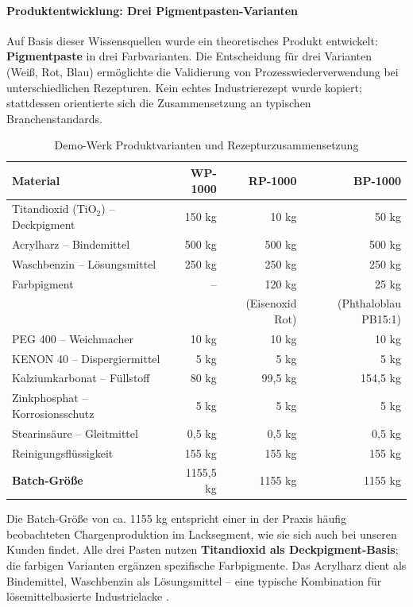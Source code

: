 \paragraph{Produktentwicklung: Drei Pigmentpasten-Varianten}

Auf Basis dieser Wissensquellen wurde ein theoretisches Produkt entwickelt: \textbf{Pigmentpaste} in drei Farbvarianten. Die Entscheidung für drei Varianten (Weiß, Rot, Blau) ermöglichte die Validierung von Prozesswiederverwendung bei unterschiedlichen Rezepturen. Kein echtes Industrierezept wurde kopiert; stattdessen orientierte sich die Zusammensetzung an typischen Branchenstandards.

\begin{table}[h]
\centering
\caption{Demo-Werk Produktvarianten und Rezepturzusammensetzung}
\label{tab:DemoProdukte}
\begin{tabular}{lrrr}
\hline
\textbf{Material} & \textbf{WP-1000} & \textbf{RP-1000} & \textbf{BP-1000} \\
\hline
Titandioxid (TiO$_2$) -- Deckpigment & 150 kg & 10 kg & 50 kg \\
Acrylharz -- Bindemittel & 500 kg & 500 kg & 500 kg \\
Waschbenzin -- Lösungsmittel & 250 kg & 250 kg & 250 kg \\
Farbpigment & -- & 120 kg & 25 kg \\
 & & (Eisenoxid Rot) & (Phthaloblau PB15:1) \\
PEG 400 -- Weichmacher & 10 kg & 10 kg & 10 kg \\
KENON 40 -- Dispergiermittel & 5 kg & 5 kg & 5 kg \\
Kalziumkarbonat -- Füllstoff & 80 kg & 99,5 kg & 154,5 kg \\
Zinkphosphat -- Korrosionsschutz & 5 kg & 5 kg & 5 kg \\
Stearinsäure -- Gleitmittel & 0,5 kg & 0,5 kg & 0,5 kg \\
Reinigungsflüssigkeit & 155 kg & 155 kg & 155 kg \\
\hline
\textbf{Batch-Größe} & 1155,5 kg & 1155 kg & 1155 kg \\
\hline
\end{tabular}
\end{table}

Die Batch-Größe von ca. 1155 kg entspricht einer in der Praxis häufig beobachteten Chargenproduktion im Lacksegment, wie sie sich auch bei unseren Kunden findet. Alle drei Pasten nutzen \textbf{Titandioxid als Deckpigment-Basis}; die farbigen Varianten ergänzen spezifische Farbpigmente. Das Acrylharz dient als Bindemittel, Waschbenzin als Lösungsmittel -- eine typische Kombination für lösemittelbasierte Industrielacke \citep{vci:lacke_farben2018}.


